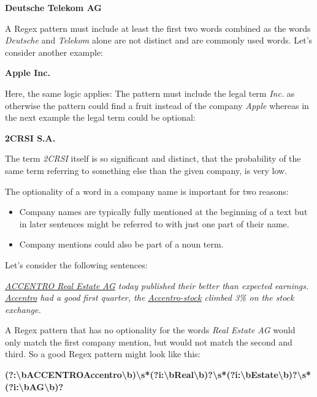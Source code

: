 \begin{center}
\textbf{Deutsche Telekom AG}
\end{center}

A \gls{Regex} pattern must include at least the first two words combined as the words \emph{Deutsche} and \emph{Telekom} alone are not distinct and are commonly used words.
Let’s consider another example:

\begin{center}
\textbf{Apple Inc.}
\end{center}

Here, the same logic applies: The pattern must include the legal term \emph{Inc.} as otherwise the pattern could find a fruit instead of the company \emph{Apple} whereas in the next example the legal term could be optional:

\begin{center}
\textbf{2CRSI S.A.}
\end{center}

The term \emph{2CRSI} itself is so significant and distinct, that the probability of the same term referring to something else than the given company, is very low.

The optionality of a word in a company name is important for two reasons:
\begin{itemize}
  \item Company names are typically fully mentioned at the beginning of a text but in later sentences might be referred to with just one part of their name.
  \item Company mentions could also be part of a noun term.
\end{itemize}

Let’s consider the following sentences:

\begin{center}
\small{\textit{\underline{ACCENTRO Real Estate AG} today published their better than expected earnings.
\underline{Accentro} had a good first quarter, the \underline{Accentro-stock} climbed 3\% on the stock exchange.}}
\end{center}

A \gls{Regex} pattern that has no optionality for the words \emph{Real Estate AG} would only match the first company mention, but would not match the second and third.
So a good \gls{Regex} pattern might look like this:

\begin{center}
\footnotesize{\textbf{(?:\textbackslash bACCENTRO\textbar Accentro\textbackslash b)\textbackslash s*(?i:\textbackslash bReal\textbackslash b)?\textbackslash s*(?i:\textbackslash bEstate\textbackslash b)?\textbackslash s*(?i:\textbackslash bAG\textbackslash b)?}}
\end{center}

